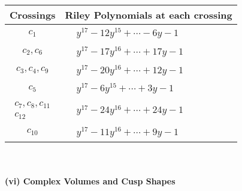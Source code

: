 \documentclass[1p]{elsarticle_modified}
\theoremstyle{definition}
\begin{document}
\begin{tabular}{m{50pt}|m{274pt}}
Crossings & \hspace{64pt}Riley Polynomials at each crossing \\
\hline $$\begin{aligned}c_{1}\end{aligned}$$&$\begin{aligned}
&y^{17}-12 y^{15}+\cdots-6 y-1
\end{aligned}$\\
\hline $$\begin{aligned}c_{2},c_{6}\end{aligned}$$&$\begin{aligned}
&y^{17}-17 y^{16}+\cdots+17 y-1
\end{aligned}$\\
\hline $$\begin{aligned}c_{3},c_{4},c_{9}\end{aligned}$$&$\begin{aligned}
&y^{17}-20 y^{16}+\cdots+12 y-1
\end{aligned}$\\
\hline $$\begin{aligned}c_{5}\end{aligned}$$&$\begin{aligned}
&y^{17}-6 y^{15}+\cdots+3 y-1
\end{aligned}$\\
\hline $$\begin{aligned}c_{7},c_{8},c_{11}\\c_{12}\end{aligned}$$&$\begin{aligned}
&y^{17}-24 y^{16}+\cdots+24 y-1
\end{aligned}$\\
\hline $$\begin{aligned}c_{10}\end{aligned}$$&$\begin{aligned}
&y^{17}-11 y^{16}+\cdots+9 y-1
\end{aligned}$\\
\hline
\end{tabular}\\~\\
\newpage\flushleft \textbf{(vi) Complex Volumes and Cusp Shapes}
\end{document}
